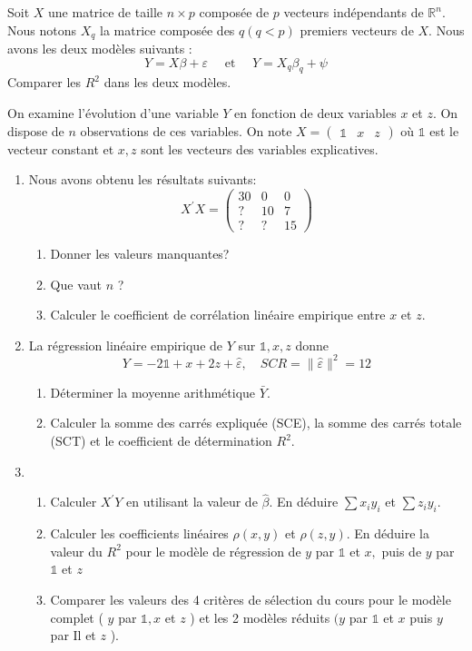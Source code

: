 \documentclass{td_um}
\providecommand{\1}{\mathds{1}}
\begin{document}
\exo{} Soit $X$ une matrice de taille $n \times p$ composée de $p$ vecteurs indépendants de $\mathbb{R}^{n}$. Nous notons $X_{q}$ la matrice composée des $q(q<p)$ premiers vecteurs de $X$. Nous avons les deux modèles suivants :
$$
Y=X \beta+\varepsilon \quad \text { et } \quad Y=X_{q} \beta_{q}+\psi
$$
Comparer les $R^{2}$ dans les deux modèles.

\exo{} On examine l'évolution d'une variable $Y$ en fonction de deux variables $x$ et $z$. On dispose de $n$ observations de ces variables. On note $X=\begin{pmatrix}\1 & x & z\end{pmatrix}$ où $\1$ est le vecteur constant et $x, z$ sont les vecteurs des variables explicatives.
\begin{enumerate}
    \item Nous avons obtenu les résultats suivants:
        $$
        X^{\prime} X=\begin{pmatrix}
                30 & 0 & 0 \\
                ? & 10 & 7 \\
                ? & ? & 15
        \end{pmatrix}
        $$
        \begin{enumerate}
            \item  Donner les valeurs manquantes?
            \item  Que vaut $n$ ?
            \item  Calculer le coefficient de corrélation linéaire empirique entre $x$ et $z$.
        \end{enumerate}
    \item  La régression linéaire empirique de $Y$ sur $\1 , x, z$ donne
        $$
        Y=-2 \1 +x+2 z+\hat{\varepsilon}, \quad S C R=\|\hat{\varepsilon}\|^{2}=12
        $$
        \begin{enumerate}
            \item Déterminer la moyenne arithmétique $\bar{Y}$.
            \item Calculer la somme des carrés expliquée (SCE), la somme des carrés totale (SCT) et le coefficient de détermination $R^{2}$.
        \end{enumerate}
    \item 
        \begin{enumerate}
            \item Calculer $X^{\prime} Y$ en utilisant la valeur de $\hat{\beta}$. En déduire $\sum x_{i} y_{i}$ et $\sum z_{i} y_{i}$.
            \item Calculer les coefficients linéaires $\rho(x, y)$ et $\rho(z, y)$. En déduire la valeur du $R^{2}$ pour le modèle de régression de $y$ par $\1 $ et $x,$ puis de $y$ par $\1 $ et $z$
            \item Comparer les valeurs des 4 critères de sélection du cours pour le modèle complet ( $y$ par $\1 , x$ et $z$ ) et les 2 modèles réduits $(y$ par $\1 $ et $x$ puis $y$ par Il et $z$ ).
        \end{enumerate}
\end{enumerate}
\end{document}
